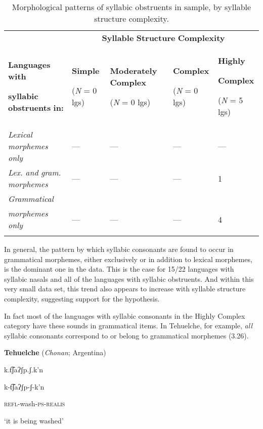 \begin{table}
\begin{tabularx}{\textwidth}{XXXXX}
 & \multicolumn{4}{c}{ \textbf{Syllable} \textbf{Structure} \textbf{Complexity}}\\
\lsptoprule
{ \textbf{Languages} \textbf{with} }

 \textbf{syllabic} \textbf{obstruents} \textbf{in:} & { \textbf{Simple}}

 (\textit{N} = 0 lgs) & { \textbf{Moderately} \textbf{Complex}}

 (\textit{N} = 0 lgs) & { \textbf{Complex}}

 (\textit{N} = 0 lgs) & { \textbf{Highly} }

{ \textbf{Complex}}

 (\textit{N} = 5 lgs)\\
 \textit{Lexical} \textit{morphemes} \textit{only} & — & — & — & —\\
 \textit{Lex.} \textit{and} \textit{gram.} \textit{morphemes} & — & — & — & 1\\
 \textit{Grammatical} \\
\textit{morphemes} \textit{only} & — & — & — & 4\\
\lspbottomrule
\end{tabularx}
\caption{\label{3.11}Morphological patterns of syllabic obstruents in sample, by syllable structure complexity.}
\end{table}

  In general, the pattern by which syllabic consonants are found to occur in grammatical morphemes, either exclusively or in addition to lexical morphemes, is the dominant one in the data. This is the case for 15/22 languages with syllabic nasals and all of the languages with syllabic obstruents. And within this very small data set, this trend also appears to increase with syllable structure complexity, suggesting support for the hypothesis. 

  In fact most of the languages with syllabic consonants in the Highly Complex category have these sounds in grammatical items. In Tehuelche, for example, \textit{all} syllabic consonants correspond to or belong to grammatical morphemes (3.26).

\ea\label{ex:(3.26)}
   \textbf{Tehuelche} (\textit{Chonan}; Argentina)

k.t͡ʃaʔʃp.ʃ.k’n

k-t͡ʃaʔʃp-ʃ-k’n

\textsc{refl}-wash-\textsc{ps-realis}

‘it is being washed’

